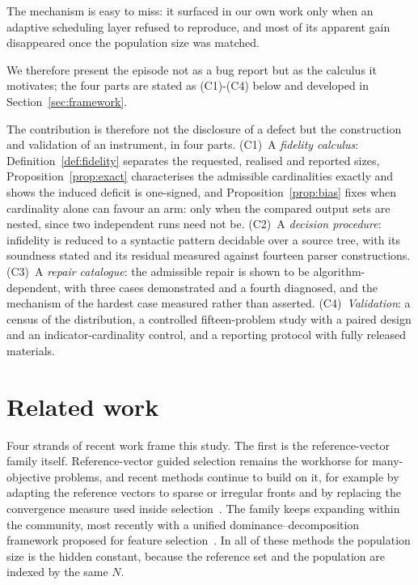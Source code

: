 \documentclass{SCIS2026}
\begin{document}
The mechanism is easy to miss: it surfaced in our own work only when an adaptive scheduling layer refused to reproduce, and most of its apparent gain disappeared once the population size was matched.

We therefore present the episode not as a bug report but as the calculus it motivates; the four parts are stated as (C1)-(C4) below and developed in Section~\ref{sec:framework}.

The contribution is therefore not the disclosure of a defect but the construction and validation of an instrument, in four parts. (C1)~A \emph{fidelity calculus}: Definition~\ref{def:fidelity} separates the requested, realised and reported sizes, Proposition~\ref{prop:exact} characterises the admissible cardinalities exactly and shows the induced deficit is one-signed, and Proposition~\ref{prop:bias} fixes when cardinality alone can favour an arm: only when the compared output sets are nested, since two independent runs need not be. (C2)~A \emph{decision procedure}: infidelity is reduced to a syntactic pattern decidable over a source tree, with its soundness stated and its residual measured against fourteen parser constructions. (C3)~A \emph{repair catalogue}: the admissible repair is shown to be algorithm-dependent, with three cases demonstrated and a fourth diagnosed, and the mechanism of the hardest case measured rather than asserted. (C4)~\emph{Validation}: a census of the distribution, a controlled fifteen-problem study with a paired design and an indicator-cardinality control, and a reporting protocol with fully released materials.

\section{Related work}
\label{sec:related}
Four strands of recent work frame this study. The first is the reference-vector family itself. Reference-vector guided selection remains the workhorse for many-objective problems, and recent methods continue to build on it, for example by adapting the reference vectors to sparse or irregular fronts and by replacing the convergence measure used inside selection~\cite{13}. The family keeps expanding within the community, most recently with a unified dominance--decomposition framework proposed for feature selection~\cite{14}. In all of these methods the population size is the hidden constant, because the reference set and the population are indexed by the same $N$.
\end{document}
